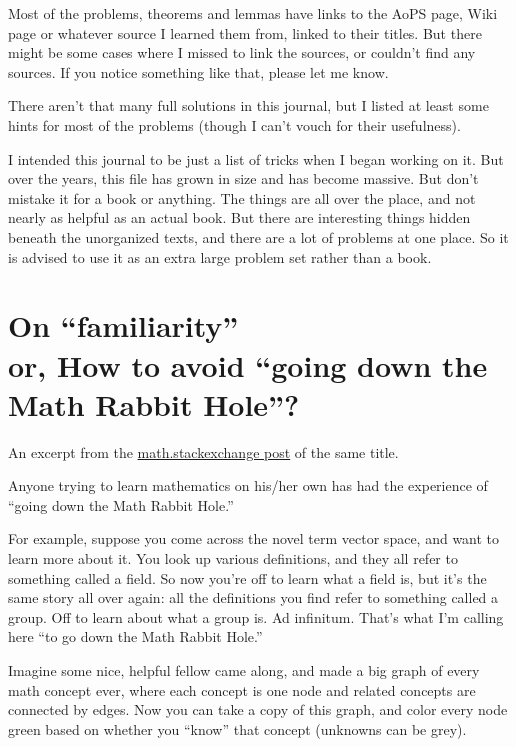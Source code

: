 Most of the problems, theorems and lemmas have links to the AoPS page, Wiki
page or whatever source I learned them from, linked to their titles. But there
might be some cases where I missed to link the sources, or couldn't find any
sources. If you notice something like that, please let me know.

There aren't that many full solutions in this journal, but I listed at least some
hints for most of the problems (though I can't vouch for their usefulness).

I intended this journal to be just a list of tricks when I began working on it.
But over the years, this file has grown in size and has become massive. But don't
mistake it for a book or anything. The things are all over the place, and not
nearly as helpful as an actual book. But there are interesting things hidden
beneath the unorganized texts, and there are a lot of problems at one place. So
it is advised to use it as an extra large problem set rather than a book.





\newpage 
\section*{\centering On ``familiarity'' \\ or, How to avoid ``going down the Math
Rabbit Hole''?}

An excerpt from the \href{https://math.stackexchange.com/questions/617625/on-familiarity-or-how-to-avoid-going-down-the-math-rabbit-hole}{math.stackexchange post} of the same title.

Anyone trying to learn mathematics on his/her own has had the experience of
``going down the Math Rabbit Hole.''

For example, suppose you come across the novel term vector space, and want to
learn more about it. You look up various definitions, and they all refer to
something called a field. So now you're off to learn what a field is, but it's
the same story all over again: all the definitions you find refer to something
called a group. Off to learn about what a group is. Ad infinitum. That's what
I'm calling here ``to go down the Math Rabbit Hole.''

Imagine some nice, helpful fellow came along, and made a big graph of every
math concept ever, where each concept is one node and related concepts are
connected by edges. Now you can take a copy of this graph, and color every
node green based on whether you ``know'' that concept (unknowns can be grey).

